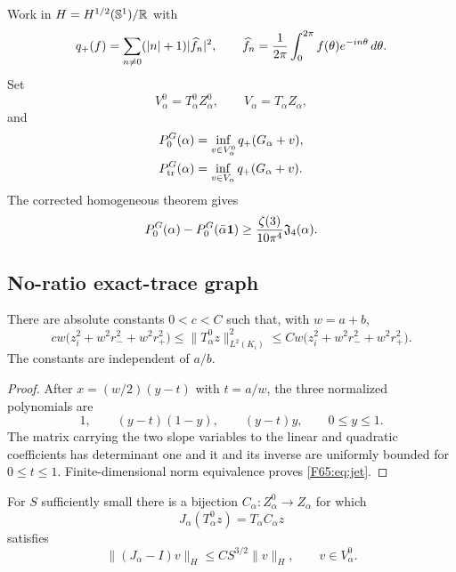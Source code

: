 Work in $H=H^{1/2}(\mathbb S^1)/\mathbb R$ with
\begin{equation}\label{F65:eq:qplus}
 q_+(f)=\sum_{n\ne0}(|n|+1)|\widehat f_n|^2,
 \qquad
 \widehat f_n=\frac1{2\pi}\int_0^{2\pi}f(\theta)e^{-in\theta}\,d\theta.
\end{equation}
Set
\begin{equation}
 V_\alpha^0=T_\alpha^0Z_\alpha^0,
 \qquad V_\alpha=T_\alpha Z_\alpha,
\end{equation}
and
\begin{align}
 P_0^G(\alpha)&=\inf_{v\in V_\alpha^0}q_+(G_\alpha+v),
 \label{F65:eq:P0}\\
 P_{\rm tr}^G(\alpha)&=\inf_{v\in V_\alpha}q_+(G_\alpha+v).
 \label{F65:eq:Ptr}
\end{align}
The corrected homogeneous theorem gives
\begin{equation}\label{F65:eq:input-gap}
 P_0^G(\alpha)-P_0^G(\bar\alpha\mathbf1)
 \ge\frac{\zeta(3)}{10\pi^4}\mathfrak J_4(\alpha).
\end{equation}

\subsection{No-ratio exact-trace graph}

\begin{lemma}\label{F65:lem:jet}
There are absolute constants $0<c<C$ such that, with $w=a+b$,
\begin{equation}\label{F65:eq:jet}
 cw\bigl(z_i^2+w^2r_-^2+w^2r_+^2\bigr)
 \le\|T_\alpha^0z\|_{L^2(K_i)}^2
 \le Cw\bigl(z_i^2+w^2r_-^2+w^2r_+^2\bigr).
\end{equation}
The constants are independent of $a/b$.
\end{lemma}

\begin{proof}
After $x=(w/2)(y-t)$ with $t=a/w$, the three normalized polynomials are
\begin{equation}
 1,\qquad (y-t)(1-y),\qquad (y-t)y,
 \qquad 0\le y\le1.
\end{equation}
The matrix carrying the two slope variables to the linear and quadratic
coefficients has determinant one and it and its inverse are uniformly
bounded for $0\le t\le1$.  Finite-dimensional norm equivalence proves
\eqref{F65:eq:jet}.
\end{proof}

\begin{lemma}\label{F65:lem:graph}
For $S$ sufficiently small there is a bijection
$C_\alpha:Z_\alpha^0\to Z_\alpha$ for which
\begin{equation}
 J_\alpha(T_\alpha^0z)=T_\alpha C_\alpha z
\end{equation}
satisfies
\begin{equation}\label{F65:eq:Jclose}
 \|(J_\alpha-I)v\|_H\le CS^{3/2}\|v\|_H,
 \qquad v\in V_\alpha^0.
\end{equation}
\end{lemma}


